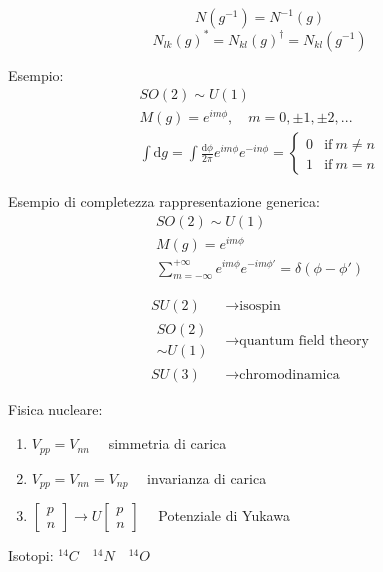 \begin{multicols}{3}
  $$N(g^{-1}) = N^{-1}(g)$$
  $$N_{lk}(g)^* = N_{kl}(g)^{\dagger} = N_{kl}(g^{-1})$$


  Esempio:
  \begin{equation}
    \begin{gathered}
      SO(2) \sim U(1) \\
      M(g) = e^{im\phi}, \quad m = 0, \pm 1, \pm 2, ... \\
      \int\text{d}g = \int \frac{\text{d}\phi}{2\pi} e^{im\phi}e^{-in\phi} = 
      \begin{cases}
        0 & \text{if}~m\neq n\\
        1 & \text{if}~m=n
      \end{cases}
    \end{gathered}
  \end{equation}

  Esempio di completezza rappresentazione generica:
  \begin{equation}
    \begin{gathered}
      SO(2) \sim U(1) \\
      M(g) = e^{im\phi} \\
      \sum_{m=-\infty}^{+\infty} e^{im\phi} e^{-im\phi'} = \delta(\phi-\phi')
    \end{gathered}
  \end{equation}

  \begin{align*}
    SU(2)& \to \text{isospin} \\
    \begin{matrix}
      SO(2) \\
      \sim U(1)
    \end{matrix}
    &\to \text{quantum field theory} \\
    SU(3)& \to \text{chromodinamica}
  \end{align*}

  Fisica nucleare:
  \begin{enumerate}
  \item $V_{pp} = V_{nn}\quad$ simmetria di carica
  \item $V_{pp} = V_{nn} = V_{np}\quad$ invarianza di carica
  \item $
    \begin{bmatrix}
      p \\
      n
    \end{bmatrix}
    \to U
    \begin{bmatrix}
      p \\
      n
    \end{bmatrix}
    \quad
    $ Potenziale di Yukawa
  \end{enumerate}

  Isotopi:
  $^{14}C \quad ^{14}N \quad ^{14}O$


\end{multicols}


